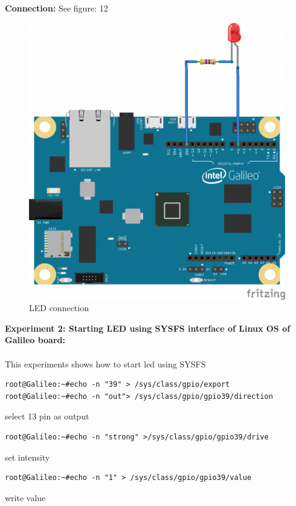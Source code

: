 \documentclass[11pt,a4paper]{article}
\begin{document}
\textbf{Connection:}
See figure: 12
\begin{figure}
	\includegraphics[width=\linewidth]{9.png}
    \caption{LED connection}
    \end{figure}
    
\vspace{1cm}
    \textbf{\Large{Experiment 2: Starting LED using SYSFS interface of Linux OS of Galileo board:}}\\
    \vspace{.1cm}\\
    This experiments shows how to start led using SYSFS
\begin{lstlisting}
root@Galileo:~#echo -n "39" > /sys/class/gpio/export
root@Galileo:~#echo -n "out"> /sys/class/gpio/gpio39/direction
\end{lstlisting}
select 13 pin as output
\begin{lstlisting}
root@Galileo:~#echo -n "strong" >/sys/class/gpio/gpio39/drive
\end{lstlisting}
set intensity	
\begin{lstlisting}
root@Galileo:~#echo -n "1" > /sys/class/gpio/gpio39/value
\end{lstlisting}
write value\\
\end{document}
